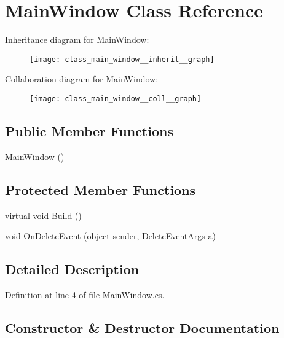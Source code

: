 \hypertarget{class_main_window}{}\section{Main\+Window Class Reference}
\label{class_main_window}


Inheritance diagram for Main\+Window\+:
\nopagebreak
\begin{figure}[H]
\begin{center}
\leavevmode
\texttt{[image: class\_main\_window\_\_inherit\_\_graph]}
\end{center}
\end{figure}


Collaboration diagram for Main\+Window\+:
\nopagebreak
\begin{figure}[H]
\begin{center}
\leavevmode
\texttt{[image: class\_main\_window\_\_coll\_\_graph]}
\end{center}
\end{figure}
\subsection*{Public Member Functions}
\begin{DoxyCompactItemize}
\item 
\hyperlink{class_main_window_af607d50e4d1b04d3c494661489283f45}{Main\+Window} ()
\end{DoxyCompactItemize}
\subsection*{Protected Member Functions}
\begin{DoxyCompactItemize}
\item 
virtual void \hyperlink{class_main_window_a952a77b964806830814cf4cdfbb2f0b9}{Build} ()
\item 
void \hyperlink{class_main_window_a64bdcb29cebb58957790da1ee2733fe1}{On\+Delete\+Event} (object sender, Delete\+Event\+Args a)
\end{DoxyCompactItemize}


\subsection{Detailed Description}


Definition at line 4 of file Main\+Window.\+cs.



\subsection{Constructor \& Destructor Documentation}
